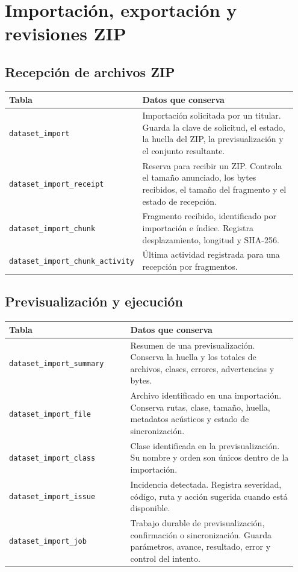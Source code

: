 \section*{Importación, exportación y revisiones ZIP}

\subsection*{Recepción de archivos ZIP}

\noindent
\begin{tabular}{@{}p{0.40\linewidth}p{0.55\linewidth}@{}}
\hline
\textbf{Tabla} & \textbf{Datos que conserva} \\
\hline
\texttt{dataset\_\allowbreak{}import} & Importación solicitada por un titular. Guarda la clave de solicitud, el estado, la huella del ZIP, la previsualización y el conjunto resultante. \\
\texttt{dataset\_\allowbreak{}import\_\allowbreak{}receipt} & Reserva para recibir un ZIP. Controla el tamaño anunciado, los bytes recibidos, el tamaño del fragmento y el estado de recepción. \\
\texttt{dataset\_\allowbreak{}import\_\allowbreak{}chunk} & Fragmento recibido, identificado por importación e índice. Registra desplazamiento, longitud y SHA-256. \\
\texttt{dataset\_\allowbreak{}import\_\allowbreak{}chunk\_\allowbreak{}activity} & Última actividad registrada para una recepción por fragmentos. \\
\hline
\end{tabular}

\subsection*{Previsualización y ejecución}

\noindent
\begin{tabular}{@{}p{0.40\linewidth}p{0.55\linewidth}@{}}
\hline
\textbf{Tabla} & \textbf{Datos que conserva} \\
\hline
\texttt{dataset\_\allowbreak{}import\_\allowbreak{}summary} & Resumen de una previsualización. Conserva la huella y los totales de archivos, clases, errores, advertencias y bytes. \\
\texttt{dataset\_\allowbreak{}import\_\allowbreak{}file} & Archivo identificado en una importación. Conserva rutas, clase, tamaño, huella, metadatos acústicos y estado de sincronización. \\
\texttt{dataset\_\allowbreak{}import\_\allowbreak{}class} & Clase identificada en la previsualización. Su nombre y orden son únicos dentro de la importación. \\
\texttt{dataset\_\allowbreak{}import\_\allowbreak{}issue} & Incidencia detectada. Registra severidad, código, ruta y acción sugerida cuando está disponible. \\
\texttt{dataset\_\allowbreak{}import\_\allowbreak{}job} & Trabajo durable de previsualización, confirmación o sincronización. Guarda parámetros, avance, resultado, error y control del intento. \\
\hline
\end{tabular}

